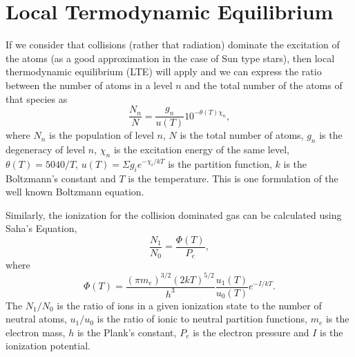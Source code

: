 \documentclass[dvips,12pt,a4paper]{report}
\begin{document}
{\section {Local Termodynamic Equilibrium}
\label{LTE}
If we consider that collisions (rather that radiation) dominate the excitation of the atoms (as a good approximation in the case of Sun type stars), then local thermodynamic equilibrium (LTE) will apply and we can express the ratio between the number of atoms in a level $n$ and the total number of the atoms of that species as
\begin{equation}
\label{Boltz}
 \frac{N_n}{N}=\frac{g_n}{u(T)}10^{-\theta(T)\chi_n},
\end{equation}
where $N_n$ is the population of level $n$, $N$ is the total number of atoms, $g_n$ is the degeneracy of level $n$, $\chi_n$ is the excitation energy of the same level, $\theta(T)=5040/T$, $u(T)=\Sigma g_ie^{-\chi_i/kT}$ is the partition function, $k$ is the Boltzmann's constant and $T$ is the temperature. This is one formulation of the well known Boltzmann equation. %

Similarly, the ionization for the collision dominated gas can be calculated using Saha's Equation,
\begin{equation}
\label{Saha}
\frac{N_1}{N_0}=\frac{\Phi(T)}{P_e},
\end{equation}
where 
\begin {equation}
\Phi(T)=\frac{(\pi m_e)^{3/2}(2kT)^{5/2}}{h^3}\frac{u_1(T)}{u_0(T)}e^{-I/kT}.
\end {equation}
The $N_1/N_0$ is the ratio of ions in a given ionization state  to the number of neutral atoms, $u_1/u_0$ is the ratio of ionic to neutral partition functions, $m_e$ is the electron mass, $h$ is the Plank's constant, $P_e$ is the electron pressure and $I$ is the ionization potential.





}
\end{document}
